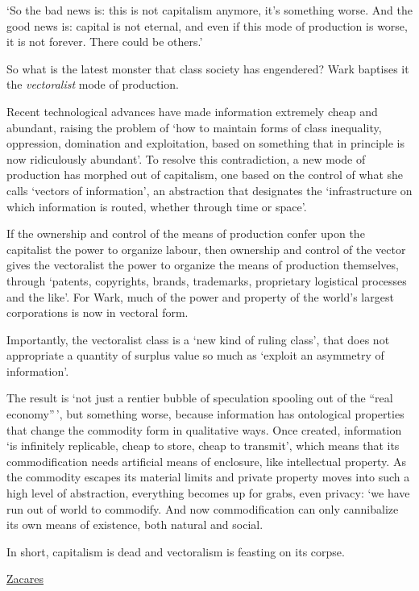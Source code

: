 \documentclass[
]{book}
\begin{document}
`So the bad news is: this is not capitalism anymore, it's something worse. And the good news is: capital is not eternal, and even if this mode of production is worse, it is not forever. There could be others.'

So what is the latest monster that class society has engendered? Wark baptises it the \emph{vectoralist} mode of production.

Recent technological advances have made information extremely cheap and abundant, raising the problem of `how to maintain forms of class inequality, oppression, domination and exploitation, based on something that in principle is now ridiculously abundant'. To resolve this contradiction, a new mode of production has morphed out of capitalism, one based on the control of what she calls `vectors of information', an abstraction that designates the `infrastructure on which information is routed, whether through time or space'.

If the ownership and control of the means of production confer upon the capitalist the power to organize labour, then ownership and control of the vector gives the vectoralist the power to organize the means of production themselves, through `patents, copyrights, brands, trademarks, proprietary logistical processes and the like'. For Wark, much of the power and property of the world's largest corporations is now in vectoral form.

Importantly, the vectoralist class is a `new kind of ruling class', that does not appropriate a quantity of surplus value so much as `exploit an asymmetry of information'.

The result is `not just a rentier bubble of speculation spooling out of the ``real economy''\,', but something worse, because information has ontological properties that change the commodity form in qualitative ways. Once created, information `is infinitely replicable, cheap to store, cheap to transmit', which means that its commodification needs artificial means of enclosure, like intellectual property. As the commodity escapes its material limits and private property moves into such a high level of abstraction, everything becomes up for grabs, even privacy: `we have run out of world to commodify. And now commodification can only cannibalize its own means of existence, both natural and social.

In short, capitalism is dead and vectoralism is feasting on its corpse.

\href{https://newleftreview.org/issues/ii129/articles/javier-moreno-zacares-euphoria-of-the-rentier}{Zacares}
\end{document}
